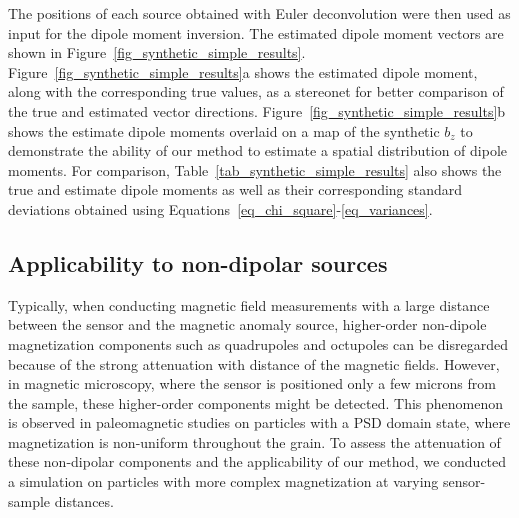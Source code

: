 The positions of each source obtained with Euler deconvolution were then used as input for the dipole moment inversion.
The estimated dipole moment vectors are shown in Figure~\ref{fig_synthetic_simple_results}.
Figure~\ref{fig_synthetic_simple_results}a shows the estimated dipole moment, along with the corresponding true values, as a stereonet for better comparison of the true and estimated vector directions.
Figure~\ref{fig_synthetic_simple_results}b shows the estimate dipole moments overlaid on a map of the synthetic $b_z$ to demonstrate the ability of our method to estimate a spatial distribution of dipole moments.
For comparison, Table~\ref{tab_synthetic_simple_results} also shows the true and estimate dipole moments as well as their corresponding standard deviations obtained using Equations~\ref{eq_chi_square}-\ref{eq_variances}.



\subsection{Applicability to non-dipolar sources}

Typically, when conducting magnetic field measurements with a large distance between the sensor and the magnetic anomaly source, higher-order non-dipole magnetization components such as quadrupoles and octupoles can be disregarded because of the strong attenuation with distance of the magnetic fields. 
However, in magnetic microscopy, where the sensor is positioned only a few microns from the sample, these higher-order components might be detected. 
This phenomenon is observed in paleomagnetic studies on particles with a PSD domain state, where magnetization is non-uniform throughout the grain. 
To assess the attenuation of these non-dipolar components and the applicability of our method, we conducted a simulation on particles with more complex magnetization at varying sensor-sample distances.


